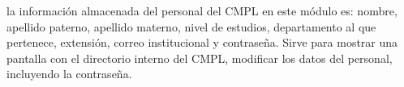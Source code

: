 la información almacenada del personal del CMPL en este módulo es: nombre, apellido paterno, apellido materno, nivel de estudios, departamento al que pertenece, extensión, correo institucional y contraseña. Sirve para mostrar una pantalla con el directorio interno del CMPL, modificar los datos del personal, incluyendo la contraseña.\\

